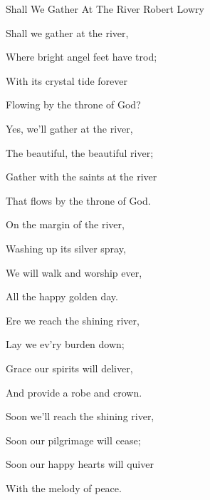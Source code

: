 \documentclass[12pt]{book}
\begin{document}
\begin{song}{Shall We Gather At The River}{}
  {\SBPubDom}
  {Robert Lowry}
  {}
  {}

  \begin{SBVerse}
    Shall we gather at the river,

    Where bright angel feet have trod;

    With its crystal tide forever

    Flowing by the throne of God?
  \end{SBVerse}

  \begin{SBOpGroup}
    Yes, we'll gather at the river,

    The beautiful, the beautiful river;

    Gather with the saints at the river

    That flows by the throne of God.
  \end{SBOpGroup}

  \begin{SBVerse}
    On the margin of the river,

    Washing up its silver spray,

    We will walk and worship ever,

    All the happy golden day.
  \end{SBVerse}

  \begin{SBVerse}
    Ere we reach the shining river,

    Lay we ev'ry burden down;

    Grace our spirits will deliver,

    And provide a robe and crown.
  \end{SBVerse}

  \begin{SBVerse}
    Soon we'll reach the shining river,

    Soon our pilgrimage will cease;

    Soon our happy hearts will quiver

    With the melody of peace.
  \end{SBVerse}
\end{song}
\end{document}
